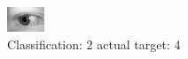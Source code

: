 \begin{figure}[h!]
\begin{center}
\includegraphics[width=0.60\columnwidth]{figures/ID787_class_2_target_4.png}
\end{center}
\caption{ Classification: 2 actual target: 4}
\label{fig:ID787_class_2_target_4}
\end{figure}
